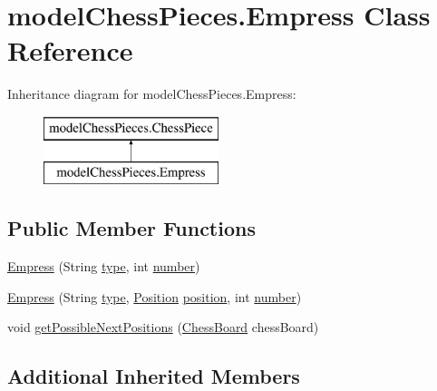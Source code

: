 \hypertarget{classmodel_chess_pieces_1_1_empress}{\section{model\+Chess\+Pieces.\+Empress Class Reference}
\label{classmodel_chess_pieces_1_1_empress}
}
Inheritance diagram for model\+Chess\+Pieces.\+Empress\+:\begin{figure}[H]
\begin{center}
\leavevmode
\includegraphics[height=2.000000cm]{classmodel_chess_pieces_1_1_empress}
\end{center}
\end{figure}
\subsection*{Public Member Functions}
\begin{DoxyCompactItemize}
\item 
\hyperlink{classmodel_chess_pieces_1_1_empress_a6e3bd690dae8ab6f26ece63c27f0e144}{Empress} (String \hyperlink{classmodel_chess_pieces_1_1_chess_piece_a195487ca88c197af7c1604247be31db2}{type}, int \hyperlink{classmodel_chess_pieces_1_1_chess_piece_a979e63b99128333883acedc38d25dc87}{number})
\item 
\hyperlink{classmodel_chess_pieces_1_1_empress_ac38cc0d134a721d07434d3d9b9793e30}{Empress} (String \hyperlink{classmodel_chess_pieces_1_1_chess_piece_a195487ca88c197af7c1604247be31db2}{type}, \hyperlink{classmodel_core_1_1_position}{Position} \hyperlink{classmodel_chess_pieces_1_1_chess_piece_a3d4362d5b28f6edb14161196d9c6807d}{position}, int \hyperlink{classmodel_chess_pieces_1_1_chess_piece_a979e63b99128333883acedc38d25dc87}{number})
\item 
void \hyperlink{classmodel_chess_pieces_1_1_empress_ac5472ff090649a67a42e6aa1c3500de3}{get\+Possible\+Next\+Positions} (\hyperlink{classmodel_core_1_1_chess_board}{Chess\+Board} chess\+Board)
\end{DoxyCompactItemize}
\subsection*{Additional Inherited Members}


